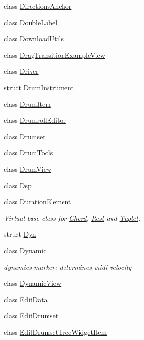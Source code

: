 \begin{DoxyCompactItemize}
\item 
class \hyperlink{class_ms_1_1_directions_anchor}{Directions\+Anchor}
\item 
class \hyperlink{class_ms_1_1_double_label}{Double\+Label}
\item 
class \hyperlink{class_ms_1_1_download_utils}{Download\+Utils}
\item 
class \hyperlink{class_ms_1_1_drag_transition_example_view}{Drag\+Transition\+Example\+View}
\item 
class \hyperlink{class_ms_1_1_driver}{Driver}
\item 
struct \hyperlink{struct_ms_1_1_drum_instrument}{Drum\+Instrument}
\item 
class \hyperlink{class_ms_1_1_drum_item}{Drum\+Item}
\item 
class \hyperlink{class_ms_1_1_drumroll_editor}{Drumroll\+Editor}
\item 
class \hyperlink{class_ms_1_1_drumset}{Drumset}
\item 
class \hyperlink{class_ms_1_1_drum_tools}{Drum\+Tools}
\item 
class \hyperlink{class_ms_1_1_drum_view}{Drum\+View}
\item 
class \hyperlink{class_ms_1_1_dsp}{Dsp}
\item 
class \hyperlink{class_ms_1_1_duration_element}{Duration\+Element}
\begin{DoxyCompactList}\small\item\em Virtual base class for \hyperlink{class_ms_1_1_chord}{Chord}, \hyperlink{class_ms_1_1_rest}{Rest} and \hyperlink{class_ms_1_1_tuplet}{Tuplet}. \end{DoxyCompactList}\item 
struct \hyperlink{struct_ms_1_1_dyn}{Dyn}
\item 
class \hyperlink{class_ms_1_1_dynamic}{Dynamic}
\begin{DoxyCompactList}\small\item\em dynamics marker; determines midi velocity \end{DoxyCompactList}\item 
class \hyperlink{class_ms_1_1_dynamic_view}{Dynamic\+View}
\item 
class \hyperlink{class_ms_1_1_edit_data}{Edit\+Data}
\item 
class \hyperlink{class_ms_1_1_edit_drumset}{Edit\+Drumset}
\item 
class \hyperlink{class_ms_1_1_edit_drumset_tree_widget_item}{Edit\+Drumset\+Tree\+Widget\+Item}
\item 

\end{DoxyCompactItemize}
